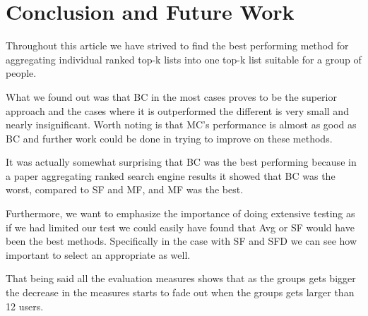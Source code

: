 \section{Conclusion and Future Work}\label{sec:conclusion}
Throughout this article we have strived to find the best performing method for aggregating individual ranked top-k lists into one top-k list suitable for a group of people.

What we found out was that BC in the most cases proves to be the superior approach and the cases where it is outperformed the different is very small and nearly insignificant. Worth noting is that MC's performance is almost as good as BC and further work could be done in trying to improve on these methods. 

It was actually somewhat surprising that BC was the best performing because in a paper aggregating ranked search engine results it showed that BC was the worst, compared to SF and MF, and MF was the best.

Furthermore, we want to emphasize the importance of doing extensive testing as if we had limited our test we could easily have found that Avg or SF would have been the best methods. Specifically in the case with SF and SFD we can see how important to select an appropriate as well.

That being said all the evaluation measures shows that as the groups gets bigger the decrease in the measures starts to fade out when the groups gets larger than 12 users. 

